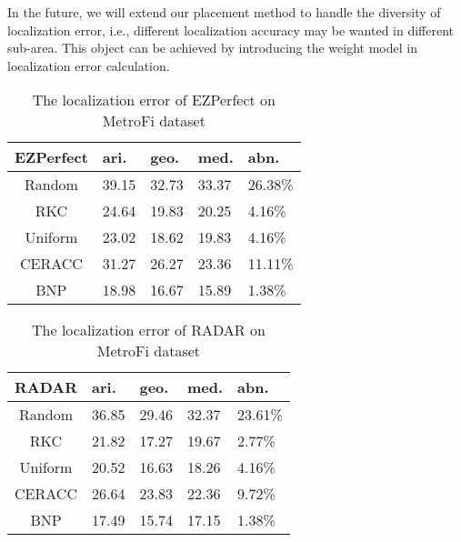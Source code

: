 \documentclass[10pt, conference, letterpaper]{IEEEtran}
\begin{document}
In the future, we will extend our placement method to handle the diversity of localization error, i.e., different localization accuracy may be wanted in different sub-area. This object can be achieved by introducing the weight model in localization error calculation.

\begin{table}[!t]
\renewcommand{\arraystretch}{1.0}
\caption{The localization error of EZPerfect on MetroFi dataset} \label{experiment_error_MetroFi_EZPerfect}
\centering
\begin{tabular}{|c|p{0.9cm}|p{0.9cm}|p{0.9cm}|p{0.9cm}|}
  \hline
EZPerfect  & ari. & geo. & med. & abn. \\
  \hline
  Random & 39.15 & 32.73 & 33.37 & 26.38\% \\
  \hline
  RKC & 24.64 & 19.83 & 20.25 & 4.16\% \\
  \hline
  Uniform & 23.02 & 18.62 & 19.83 & 4.16\% \\
  \hline
  CERACC & 31.27 & 26.27 & 23.36 & 11.11\% \\
  \hline
  BNP & 18.98 & 16.67 & 15.89 & 1.38\% \\
  \hline
\end{tabular}
\end{table}

\begin{table}[!t]
\renewcommand{\arraystretch}{1.0}
\caption{The localization error of RADAR on MetroFi dataset} \label{experiment_error_MetroFi_RADAR}
\centering
\begin{tabular}{|c|p{0.9cm}|p{0.9cm}|p{0.9cm}|p{0.9cm}|}
  \hline
RADAR  & ari. & geo. & med. & abn. \\
  \hline
  Random & 36.85 & 29.46 & 32.37 & 23.61\% \\
  \hline
  RKC & 21.82 & 17.27 & 19.67 & 2.77\% \\
  \hline
  Uniform & 20.52 & 16.63 & 18.26 & 4.16\% \\
  \hline
  CERACC & 26.64 & 23.83 & 22.36 & 9.72\% \\
  \hline
  BNP & 17.49 & 15.74 & 17.15 & 1.38\% \\
  \hline
\end{tabular}
\end{table}

\vspace{-1.8ex}
\end{document}
